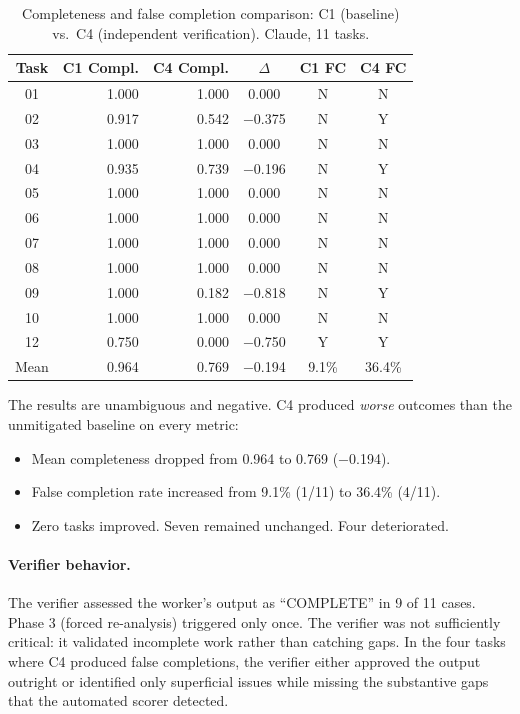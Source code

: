 \begin{table}[htbp]
\centering
\caption{Completeness and false completion comparison: C1 (baseline) vs.\ C4 (independent verification). Claude, 11 tasks.}
\label{tab:c4-results}
\begin{tabular}{crrccc}
\toprule
Task & C1 Compl. & C4 Compl. & $\Delta$ & C1 FC & C4 FC \\
\midrule
01 & 1.000 & 1.000 &  0.000 & N & N \\
02 & 0.917 & 0.542 & $-$0.375 & N & Y \\
03 & 1.000 & 1.000 &  0.000 & N & N \\
04 & 0.935 & 0.739 & $-$0.196 & N & Y \\
05 & 1.000 & 1.000 &  0.000 & N & N \\
06 & 1.000 & 1.000 &  0.000 & N & N \\
07 & 1.000 & 1.000 &  0.000 & N & N \\
08 & 1.000 & 1.000 &  0.000 & N & N \\
09 & 1.000 & 0.182 & $-$0.818 & N & Y \\
10 & 1.000 & 1.000 &  0.000 & N & N \\
12 & 0.750 & 0.000 & $-$0.750 & Y & Y \\
\midrule
Mean & 0.964 & 0.769 & $-$0.194 & 9.1\% & 36.4\% \\
\bottomrule
\end{tabular}
\end{table}

The results are unambiguous and negative. C4 produced \emph{worse} outcomes than the unmitigated baseline on every metric:

\begin{itemize}[nosep]
  \item Mean completeness dropped from 0.964 to 0.769 ($-$0.194).
  \item False completion rate increased from 9.1\% (1/11) to 36.4\% (4/11).
  \item Zero tasks improved. Seven remained unchanged. Four deteriorated.
\end{itemize}

\paragraph{Verifier behavior.}
The verifier assessed the worker's output as ``COMPLETE'' in 9 of 11 cases. Phase 3 (forced re-analysis) triggered only once. The verifier was not sufficiently critical: it validated incomplete work rather than catching gaps. In the four tasks where C4 produced false completions, the verifier either approved the output outright or identified only superficial issues while missing the substantive gaps that the automated scorer detected.


